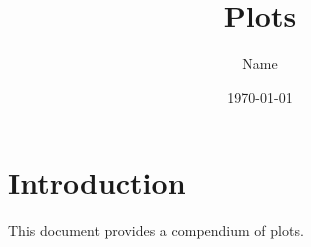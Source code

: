 \documentclass[12pt]{article}
\begin{document}
\title{Plots}
\author{Name}
\date{\today} %
\maketitle

\tableofcontents %

\section{Introduction}
This document provides a compendium of plots.

\end{document}

